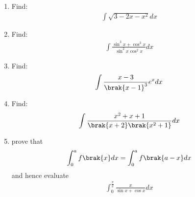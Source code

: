 \begin{enumerate}
\item Find: \begin{align*}\int\sqrt{3-2x-x^2}dx\end{align*}
\item Find: \begin{align*}\int{\frac{\sin^3{x}+\cos^3{x}}{\sin^2{x}\cos^2{x}}}dx\end{align*}
\item Find: \begin{align*}\int{\frac{x-3}{\brak{x-1}^3}}e^x 
dx\end{align*}
\item Find: \begin{align*}\int{\frac{x^2+x+1}{\brak{x+2}\brak{x^2+1}}}dx\end{align*}
\item prove that 
\begin{align*}
    \int_{0}^{a} f\brak{x}dx = \int_{0}^{a} f\brak{a-x}dx
\end{align*}
and hence evaluate 
\begin{align*}
\int_{0}^{\frac{\pi}{2}}\frac{x}{{\sin x}+{\cos x}}dx
\end{align*}
\end{enumerate}